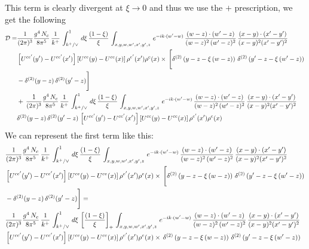 \documentclass[9pt]{article}
\numberwithin{equation}{section}
\begin{document}
This term is clearly divergent at $\xi \to 0$ and thus we use the $+$ prescription, we get the
following
\begin{align}\label{eq:addsub}
    \mathcal{D} = &\frac{1}{(2\pi)^{3}}\frac{g^{4}\,N_{c}}{8\pi^{5}}\,\frac{1}{k^{+}}\,\int_{k^{+}/\vee}^{1}\,d\xi\,\frac{(1-\xi)}{\xi}\,\int_{x,y,w,w',x',y',z}\,e^{-ik\cdot(w'-w)}\,\frac{(w-z)\cdot (w'-z)}{(w-z)^{2}\, (w'-z)^{2}}\,\frac{(x-y)\cdot(x'-y')}{(x-y)^{2}(x'-y')^{2}}\notag \\ &\left[U^{ce'}(y')-U^{ce'}(x')\right]\left[U^{ce}(y)-U^{ce}(x)\right]\rho^{e'}(x')\rho^{e}(x)\times\, \Bigg[\delta^{(2)}\left(y-z-\xi\,(w-z)\right)\, \delta^{(2)}\left(y'-z-\xi\,(w'-z)\right)\,\notag \\ &  - \delta^{(2)}(y-z)\, \delta^{(2)}(y'-z)\Bigg]\notag \\ & +\,\frac{1}{(2\pi)^{3}}\frac{g^{4}\,N_{c}}{8\pi^{5}}\,\frac{1}{k^{+}}\,\int_{k^{+}/\vee}^{1}\,d\xi\,\frac{(1-\xi)}{\xi}\,\int_{x,y,w,w',x',y',z}\,e^{-ik\cdot(w'-w)}\,\frac{(w-z)\cdot (w'-z)}{(w-z)^{2}\, (w'-z)^{2}}\,\frac{(x-y)\cdot(x'-y')}{(x-y)^{2}(x'-y')^{2}}\notag \\ &\delta^{(2)}(y-z)\,\delta^{(2)}(y'-z)\,\left[U^{ce'}(y')-U^{ce'}(x')\right]\left[U^{ce}(y)-U^{ce}(x)\right]\rho^{e'}(x')\rho^{e}(x)
\end{align}
We can represent the first term like this:
\begin{align}\label{eq:plusdef}
   &  \frac{1}{(2\pi)^{3}}\frac{g^{4}\,N_{c}}{8\pi^{5}}\,\frac{1}{k^{+}}\,\int_{k^{+}/\vee}^{1}\,d\xi\,\frac{(1-\xi)}{\xi}\,\int_{x,y,w,w',x',y',z}\,e^{-ik\cdot(w'-w)}\,\frac{(w-z)\cdot (w'-z)}{(w-z)^{2}\, (w'-z)^{2}}\,\frac{(x-y)\cdot(x'-y')}{(x-y)^{2}(x'-y')^{2}}\notag \\ &\left[U^{ce'}(y')-U^{ce'}(x')\right]\left[U^{ce}(y)-U^{ce}(x)\right]\rho^{e'}(x')\rho^{e}(x)\times\, \Bigg[\delta^{(2)}\left(y-z-\xi\,(w-z)\right)\, \delta^{(2)}\left(y'-z-\xi\,(w'-z)\right)\,\notag \\ &  - \delta^{(2)}(y-z)\, \delta^{(2)}(y'-z)\Bigg]  = \notag \\ &  \frac{1}{(2\pi)^{3}}\frac{g^{4}\,N_{c}}{8\pi^{5}}\,\frac{1}{k^{+}}\,\int_{k^{+}/\vee}^{1}\,d\xi\,\left[\frac{(1-\xi)}{\xi}\right]_{+}\,\int_{x,y,w,w',x',y',z}\,e^{-ik\cdot(w'-w)}\,\frac{(w-z)\cdot (w'-z)}{(w-z)^{2}\, (w'-z)^{2}}\,\frac{(x-y)\cdot(x'-y')}{(x-y)^{2}(x'-y')^{2}}\notag \\ &\left[U^{ce'}(y')-U^{ce'}(x')\right]\left[U^{ce}(y)-U^{ce}(x)\right]\rho^{e'}(x')\rho^{e}(x)\times\,\delta^{(2)}\left(y-z-\xi\,(w-z)\right)\, \delta^{(2)}\left(y'-z-\xi\,(w'-z)\right)
\end{align}
\end{document}
